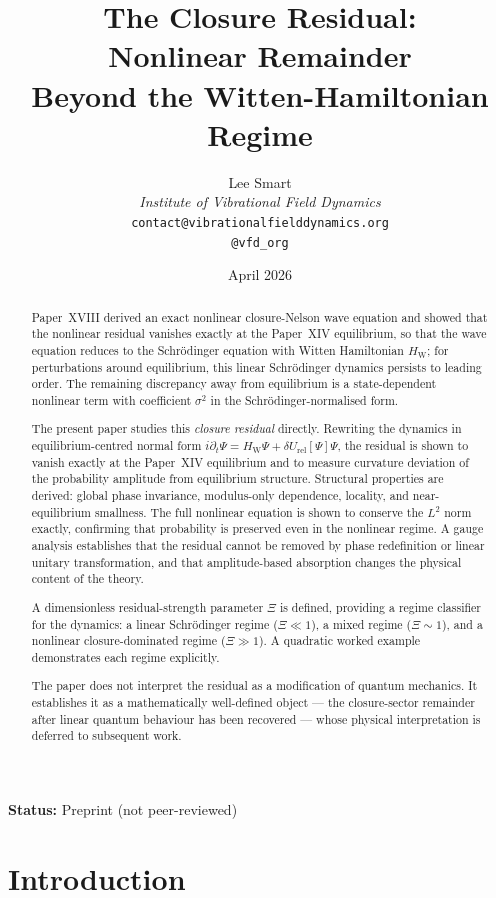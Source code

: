 \documentclass[12pt]{article}
\title{The Closure Residual:\\Nonlinear Remainder\\Beyond the Witten-Hamiltonian Regime}
\author{%
  Lee Smart\\[4pt]
  \textit{Institute of Vibrational Field Dynamics}\\[2pt]
  \texttt{contact@vibrationalfielddynamics.org}\\[2pt]
  \texttt{@vfd\_org}%
}
\date{April 2026}
\newcommand{\HW}{H_{\mathrm{W}}}
\newcommand{\dUrel}{\delta U_{\mathrm{rel}}}
\begin{document}
\maketitle

\noindent\textbf{Status:} Preprint (not peer-reviewed)

\begin{abstract}
Paper~XVIII derived an exact nonlinear closure-Nelson wave equation and showed that the nonlinear residual vanishes exactly at the Paper~XIV equilibrium, so that the wave equation reduces to the Schr\"odinger equation with Witten Hamiltonian $\HW$; for perturbations around equilibrium, this linear Schr\"odinger dynamics persists to leading order. The remaining discrepancy away from equilibrium is a state-dependent nonlinear term with coefficient $\sigma^2$ in the Schr\"odinger-normalised form.

The present paper studies this \textit{closure residual} directly. Rewriting the dynamics in equilibrium-centred normal form $i\partial_t\Psi = \HW\Psi + \dUrel[\Psi]\Psi$, the residual is shown to vanish exactly at the Paper~XIV equilibrium and to measure curvature deviation of the probability amplitude from equilibrium structure. Structural properties are derived: global phase invariance, modulus-only dependence, locality, and near-equilibrium smallness. The full nonlinear equation is shown to conserve the $L^2$ norm exactly, confirming that probability is preserved even in the nonlinear regime. A gauge analysis establishes that the residual cannot be removed by phase redefinition or linear unitary transformation, and that amplitude-based absorption changes the physical content of the theory.

A dimensionless residual-strength parameter $\Xi$ is defined, providing a regime classifier for the dynamics: a linear Schr\"odinger regime ($\Xi \ll 1$), a mixed regime ($\Xi \sim 1$), and a nonlinear closure-dominated regime ($\Xi \gg 1$). A quadratic worked example demonstrates each regime explicitly.

The paper does not interpret the residual as a modification of quantum mechanics. It establishes it as a mathematically well-defined object --- the closure-sector remainder after linear quantum behaviour has been recovered --- whose physical interpretation is deferred to subsequent work.
\end{abstract}

\section{Introduction}\label{sec:intro}
\end{document}
